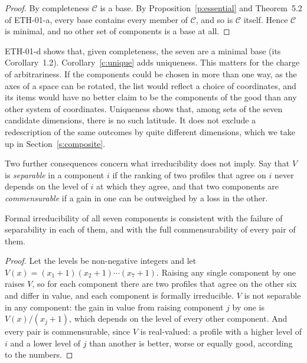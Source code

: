 \documentclass{situationist-preprint}
\begin{document}
\begin{proof}
By completeness $\mathcal{C}$ is a base. By Proposition~\ref{p:essential} and Theorem~5.2 of ETH-01-a, every base contains every member of $\mathcal{C}$, and so is $\mathcal{C}$ itself. Hence $\mathcal{C}$ is minimal, and no other set of components is a base at all.
\end{proof}

ETH-01-d shows that, given completeness, the seven are a minimal base (its Corollary~1.2). Corollary~\ref{c:unique} adds uniqueness. This matters for the charge of arbitrariness. If the components could be chosen in more than one way, as the axes of a space can be rotated, the list would reflect a choice of coordinates, and its items would have no better claim to be the components of the good than any other system of coordinates. Uniqueness shows that, among sets of the seven candidate dimensions, there is no such latitude. It does not exclude a redescription of the same outcomes by quite different dimensions, which we take up in Section~\ref{s:composite}.

Two further consequences concern what irreducibility does not imply. Say that $V$ is \emph{separable} in a component $i$ if the ranking of two profiles that agree on $i$ never depends on the level of $i$ at which they agree, and that two components are \emph{commensurable} if a gain in one can be outweighed by a loss in the other.

\begin{proposition}\label{p:interact}
Formal irreducibility of all seven components is consistent with the failure of separability in each of them, and with the full commensurability of every pair of them.
\end{proposition}

\begin{proof}
Let the levels be non-negative integers and let $V(x) = (x_1 + 1)(x_2 + 1)\cdots(x_7 + 1)$. Raising any single component by one raises $V$, so for each component there are two profiles that agree on the other six and differ in value, and each component is formally irreducible. $V$ is not separable in any component: the gain in value from raising component $j$ by one is $V(x)/(x_j+1)$, which depends on the level of every other component. And every pair is commensurable, since $V$ is real-valued: a profile with a higher level of $i$ and a lower level of $j$ than another is better, worse or equally good, according to the numbers.
\end{proof}
\end{document}
